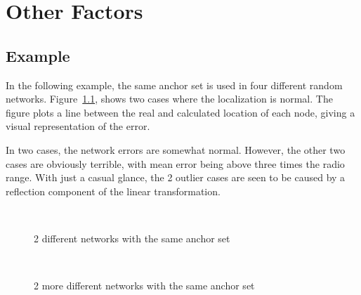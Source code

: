 \chapter{Other Factors}

\section{Example}

In the following example, the same anchor set is used in four different random networks.  Figure~\ref{fig:AS6good}, shows two cases where the localization is normal.  
The figure plots a line between the real and calculated location of each node, giving a visual representation of the error.  

In two cases, the network errors are somewhat normal.  However, the other two cases are obviously terrible, with mean error being above three times the radio range.  With just a casual glance, the 2 outlier cases are seen to be caused by a reflection component of the linear transformation.  
\begin{figure}
  \centering
	\\
	\caption{2 different networks with the same anchor set}	
	\label{fig:AS6good}
\end{figure}
\begin{figure}
  \centering
	\\
	\caption{2 more different networks with the same anchor set}	
	\label{fig:AS6bad}
\end{figure}
